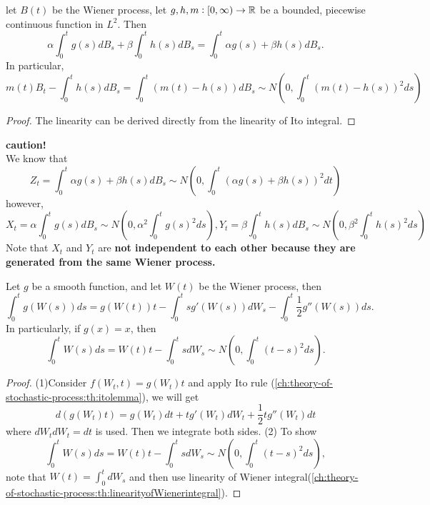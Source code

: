 \begin{refsection}
\begin{lemma}\label{ch:theory-of-stochastic-process:th:linearityofWienerintegral}
	let $B(t)$ be the Wiener process, let $g,h,m:[0,\infty) \to \mathbb{R}$ be a bounded, piecewise continuous function in $L^2$. Then
	$$\alpha \int_0^t g(s)dB_s + \beta \int_0^t h(s)dB_s = \int_0^t \alpha g(s) + \beta h(s) dB_s.$$
	In particular, 
	$$m(t)B_t - \int_0^t h(s) dB_s = \int_0^t (m(t)-h(s))dB_s \sim N(0,\int_0^t (m(t)-h(s))^2ds)$$	
\end{lemma}
\begin{proof}
	The linearity can be derived directly from the linearity of Ito integral.	
\end{proof}

\begin{mdframed}
	\textbf{caution!}\\
	We know that $$ Z_t=\int_0^t \alpha g(s) + \beta h(s) dB_s \sim N(0,\int_0^t (\alpha g(s) + \beta h(s))^2dt)$$
	however, 
	$$X_t=\alpha \int_0^t g(s)dB_s \sim N(0,\alpha^2 \int_0^t g(s)^2ds), Y_t=\beta \int_0^t h(s)dB_s \sim N(0,\beta^2 \int_0^t h(s)^2ds)$$
	Note that $X_t$ and $Y_t$ are \textbf{not independent to each other because they are generated from the same Wiener process.}
\end{mdframed}


\begin{theorem}\label{ch:theory-of-stochastic-process:th：RiemannIntegralWithWienerProcess}
	Let $g$ be a smooth function, and let $W(t)$ be the Wiener process, then
	$$\int_0^t g(W(s))ds = g(W(t))t - \int_0^t sg'(W(s))dW_s - \int_0^t \frac{1}{2}g''(W(s))ds.$$
	In particularly, if $g(x)=x$, then
	$$\int_0^t W(s)ds = W(t)t - \int_0^t sdW_s \sim N(0,\int_0^t (t-s)^2 ds).$$
\end{theorem}
\begin{proof}
	(1)Consider $f(W_t,t) = g(W_t)t$ and apply Ito rule (\autoref{ch:theory-of-stochastic-process:th:itolemma}), we will get
	$$d(g(W_t)t) = g(W_t)dt + tg'(W_t)dW_t + \frac{1}{2}tg''(W_t)dt$$
	where $dW_tdW_t = dt$ is used. Then we integrate both sides.
	(2) To show $$\int_0^t W(s)ds = W(t)t - \int_0^t sdW_s \sim N(0,\int_0^t (t-s)^2 ds),$$
	note that $W(t) = \int_0^t dW_s$ and then use linearity of Wiener integral(\autoref{ch:theory-of-stochastic-process:th:linearityofWienerintegral}).
\end{proof}



\end{refsection}
